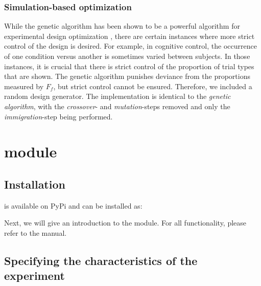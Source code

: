\documentclass[article]{jss}
\begin{document}
\subsubsection{Simulation-based optimization}

While the genetic algorithm has been shown to be a powerful algorithm
for experimental design optimization \citep{Kao2009-yo}, there are
certain instances where more strict control of the design is desired.
For example, in cognitive control, the occurrence of one condition
versus another is sometimes varied between subjects.  In those
instances, it is crucial that there is strict control of the
proportion of trial types that are shown.  The genetic algorithm
punishes deviance from the proportions measured by $F_f$, but strict
control cannot be ensured.  Therefore, we included a random design
generator.  The implementation is identical to the \textit{genetic
  algorithm}, with the \textit{crossover}- and \textit{mutation}-steps
removed and only the \textit{immigration}-step being performed.

\section[Python module neurodesign]{ module }\label{sec:pkgn-progl-module}

\subsection{Installation}\label{sec:installation}

 is available on PyPi and can be installed as:
%
\begin{CodeChunk}
\end{CodeChunk}
%
Next, we will give an introduction to the  module.  For all functionality, please refer to the manual.

\subsection{Specifying the characteristics of the experiment}
\end{document}
